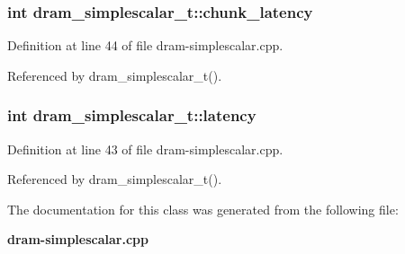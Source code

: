 \subsubsection[{chunk\_\-latency}]{\setlength{\rightskip}{0pt plus 5cm}int {\bf dram\_\-simplescalar\_\-t::chunk\_\-latency}\hspace{0.3cm}{\tt  [protected]}}\label{classdram__simplescalar__t_70c2d8e40b876b4a5a3867cb7f130147}




Definition at line 44 of file dram-simplescalar.cpp.

Referenced by dram\_\-simplescalar\_\-t().
\subsubsection[{latency}]{\setlength{\rightskip}{0pt plus 5cm}int {\bf dram\_\-simplescalar\_\-t::latency}\hspace{0.3cm}{\tt  [protected]}}\label{classdram__simplescalar__t_0a93b5b3422346497f44ae69fc565d5b}




Definition at line 43 of file dram-simplescalar.cpp.

Referenced by dram\_\-simplescalar\_\-t().

The documentation for this class was generated from the following file:\begin{CompactItemize}
\item 
{\bf dram-simplescalar.cpp}\end{CompactItemize}
